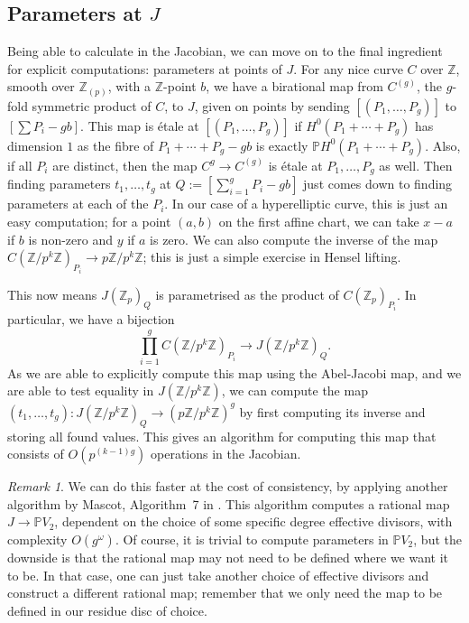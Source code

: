 \documentclass[12pt]{article}
\newcommand{\Z}{\mathbb{Z}}
\renewcommand{\P}{\mathbb{P}}
\theoremstyle{plain}
\theoremstyle{definition}
\theoremstyle{remark}
\newtheorem{rem}[thm]{Remark} %
\begin{document}
\subsection{Parameters at $J$}
\label{subs:paramj}
Being able to calculate in the Jacobian, we can move on to the final ingredient for explicit computations: parameters at points of $J$. For any nice curve $C$ over $\Z$, smooth over $\Z_{(p)}$, with a $\Z$-point $b$, we have a birational map from $C^{(g)}$, the $g$-fold symmetric product of $C$, to $J$, given on points by sending $[(P_1,\dots,P_g)]$ to $[\sum P_i - gb]$. This map is \'etale at $[(P_1,\dots,P_g)]$ if $H^0(P_1 + \cdots + P_g)$ has dimension $1$ as the fibre of $P_1 + \cdots + P_g -gb$ is exactly $\P H^0(P_1 + \cdots + P_g)$. Also, if all $P_i$ are distinct, then the map $C^g \to C^{(g)}$ is \'etale at $P_1,\dots,P_g$ as well. Then finding parameters $t_1,\dots,t_g$ at $Q := [\sum_{i=1}^g P_i - gb]$ just comes down to finding parameters at each of the $P_i$. In our case of a hyperelliptic curve, this is just an easy computation; for a point $(a,b)$ on the first affine chart, we can take $x-a$ if $b$ is non-zero and $y$ if $a$ is zero. We can also compute the inverse of the map $C(\Z/p^k\Z)_{P_i} \to p\Z/p^k\Z$; this is just a simple exercise in Hensel lifting.

This now means $J(\Z_p)_Q$ is parametrised as the product of $C(\Z_p)_{P_i}$. In particular, we have a bijection
\[
\prod_{i=1}^g C(\Z/p^k\Z)_{P_i} \to J(\Z/p^k\Z)_{Q}.
\] As we are able to explicitly compute this map using the Abel-Jacobi map, and we are able to test equality in $J(\Z/p^k\Z)$, we can compute the map $(t_1,\dots,t_g): J(\Z/p^k\Z)_Q \to (p\Z/p^{k}\Z)^g$ by first computing its inverse and storing all found values. This gives an algorithm for computing this map that consists of $O(p^{(k-1)g})$ operations in the Jacobian.

\begin{rem}
\label{rem:faster}
We can do this faster at the cost of consistency, by applying another algorithm by Mascot, Algorithm~7 in \cite{mascot18}. This algorithm computes a rational map $J \to \P V_2$, dependent on the choice of some specific degree effective divisors, with complexity $O(g^\omega)$. Of course, it is trivial to compute parameters in $\P V_2$, but the downside is that the rational map may not need to be defined where we want it to be. In that case, one can just take another choice of effective divisors and construct a different rational map; remember that we only need the map to be defined in our residue disc of choice.
\end{rem}
\end{document}
